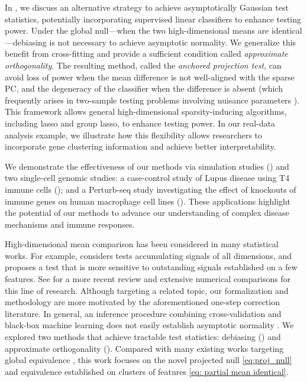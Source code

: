 \documentclass[11pt]{article}
\newenvironment{revblock}
  {\color{teal}}
  {}
\begin{document}
\begin{revblock}
In , we discuss an alternative strategy to achieve asymptotically Gaussian test statistics, potentially incorporating supervised linear classifiers to enhance testing power. Under the global null---when the two high-dimensional means are identical---debiasing is not necessary to achieve asymptotic normality. We generalize this benefit from cross-fitting and provide a sufficient condition called \emph{approximate orthogonality}. The resulting method, called the \emph{anchored projection test}, can avoid loss of power when the mean difference is not well-aligned with the sparse PC, and the degeneracy of the classifier when the difference is absent (which frequently arises in two-sample testing problems involving nuisance parameters \citep{liu2022multiple, williamson2023general, dai2022significance, lundborg2022projected}). This framework allows general high-dimensional sparsity-inducing algorithms, including lasso and group lasso, to enhance testing power. In our real-data analysis example, we illustrate how this flexibility allows researchers to incorporate gene clustering information and achieve better interpretability.
\end{revblock}


We demonstrate the effectiveness of our methods via simulation studies () and two single-cell genomic studies: a case-control study \citep{perez2022single} of Lupus disease using T4 immune cells (); and a Perturb-seq \citep{yao2024scalable} study investigating the effect of knockouts of immune genes on human macrophage cell lines (). These applications highlight the potential of our methods to advance our understanding of complex disease mechanisms and immune responses.  

\begin{revblock}
High-dimensional mean comparison has been considered in many statistical works. For example, \cite{chen2010two} considers tests accumulating signals of all dimensions, and \cite{tony2014two} proposes a test that is more sensitive to outstanding signals established on a few features. See \cite{huang2022overview} for a more recent review and extensive numerical comparisons for this line of research. Although targeting a related topic, our formalization and methodology are more motivated by the aforementioned one-step correction literature. In general, an inference procedure combining cross-validation and black-box machine learning does not easily establish asymptotic normality \cite{lei2025modern}. We explored two methods that achieve tractable test statistics: debiasing () and approximate orthogonality (). Compared with many existing works targeting global equivalence \cite{huang2022overview}, this work focuses on the novel projected null \eqref{eq:proj_null} and equivalence established on clusters of features \eqref{eq: partial mean identical}.
\end{revblock}
\end{document}
